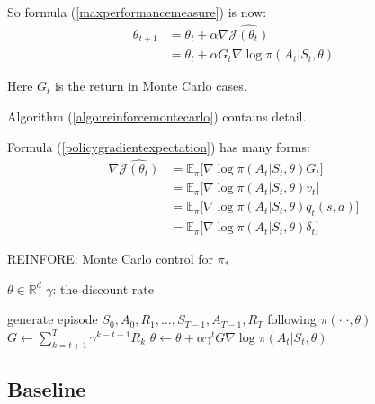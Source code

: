 So formula (\ref{maxperformancemeasure}) is now:
\begin{equation}\label{policygradientexpectation}
	\begin{aligned}
		\theta_{t+1} &= \theta_t + \alpha \nabla \widehat{\mathcal{J}(\theta_t)} \\
		&= \theta_t + \alpha  G_t \nabla \log \pi(A_t|S_t,\mathbb{\theta})
	\end{aligned}
\end{equation}

Here $G_t$ is the return in Monte Carlo cases.

Algorithm (\ref{algo:reinforcemontecarlo}) contains detail.

Formula (\ref{policygradientexpectation}) has many forms:
\begin{equation}
	\begin{aligned}
		\nabla \widehat{\mathcal{J}(\theta_t )} &= \mathbb{E}_\pi \Big[ \nabla \log \pi(A_t|S_t,\mathbb{\theta}) G_t \Big] \\
		&= \mathbb{E}_\pi \Big[  \nabla \log \pi(A_t|S_t,\mathbb{\theta})v_t \Big]  \\
		&= \mathbb{E}_\pi \Big[ \nabla \log \pi(A_t|S_t,\mathbb{\theta})q_t(s,a)  \Big] \\
		&= \mathbb{E}_\pi \Big[\nabla \log \pi(A_t|S_t,\mathbb{\theta}) \delta_t  \Big]		
	\end{aligned}
\end{equation}

\begin{algorithm}
	\caption{REINFORE: Monte Carlo control for $\pi_*$}\label{algo:reinforcemontecarlo}	
	
	\begin{algorithmic}[1]
		\State $ \theta \in \mathbb{R}^d $
		\State $\gamma$: the discount rate
		
		\Statex
		
		\Loop
			\State generate episode $S_0,A_0,R_1,\dots,S_{T-1},A_{T-1},R_T$ following $\pi(\cdot|\cdot, \theta)$
				\State $G \gets \sum_{k=t+1}^T \gamma^{k-t-1} R_k$
				\State $\theta \gets \theta + \alpha \gamma^t G \nabla \log \pi(A_t|S_t,\theta) $
			\EndFor
		\EndLoop		
	\end{algorithmic}
\end{algorithm}

\subsection{Baseline}

